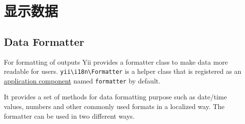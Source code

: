 \chapter{显示数据}
\label{output-formatter.md}\section{Data Formatter}
For formatting of outputs Yii provides a formatter class to make data more readable for users.
\texttt{yii{\allowbreak{}\textbackslash}i18n{\allowbreak{}\textbackslash}Formatter} is a helper class that is registered as an \hyperref[structure-application-components.md]{application component} named \lstinline|formatter| by default.

It provides a set of methods for data formatting purpose such as date/time values, numbers and other commonly used formats in a localized way.
The formatter can be used in two different ways.

